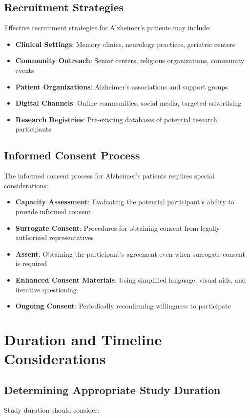 \subsection{Recruitment Strategies}
Effective recruitment strategies for Alzheimer's patients may include:

\begin{itemize}
    \item \textbf{Clinical Settings}: Memory clinics, neurology practices, geriatric centers
    \item \textbf{Community Outreach}: Senior centers, religious organizations, community events
    \item \textbf{Patient Organizations}: Alzheimer's associations and support groups
    \item \textbf{Digital Channels}: Online communities, social media, targeted advertising
    \item \textbf{Research Registries}: Pre-existing databases of potential research participants
\end{itemize}

\subsection{Informed Consent Process}
The informed consent process for Alzheimer's patients requires special considerations:

\begin{itemize}
    \item \textbf{Capacity Assessment}: Evaluating the potential participant's ability to provide informed consent
    \item \textbf{Surrogate Consent}: Procedures for obtaining consent from legally authorized representatives
    \item \textbf{Assent}: Obtaining the participant's agreement even when surrogate consent is required
    \item \textbf{Enhanced Consent Materials}: Using simplified language, visual aids, and iterative questioning
    \item \textbf{Ongoing Consent}: Periodically reconfirming willingness to participate
\end{itemize}

\section{Duration and Timeline Considerations}
\subsection{Determining Appropriate Study Duration}
Study duration should consider:

